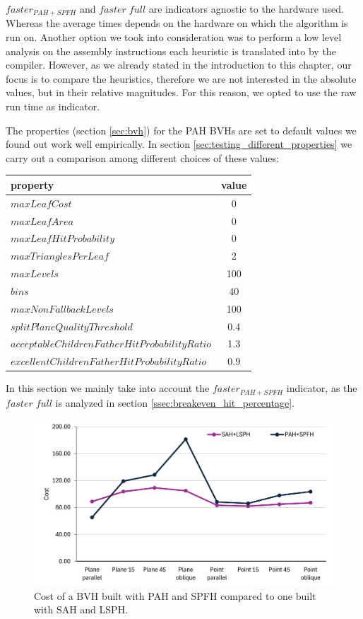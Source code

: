 \documentclass{PoliMi_MasterThesis}
\begin{document}
$faster_{PAH+SPFH}$ and $faster \; full$ are indicators agnostic to the hardware used. Whereas the average times depends on the hardware on which the algorithm is run on. Another option we took into consideration was to perform a low level analysis on the assembly instructions each heuristic is translated into by the compiler. However, as we already stated in the introduction to this chapter, our focus is to compare the heuristics, therefore we are not interested in the absolute values, but in their relative magnitudes. For this reason, we opted to use the raw run time as indicator.

The properties (section \ref{sec:bvh}) for the PAH BVHs are set to default values we found out work well empirically. In section \ref{sec:testing_different_properties} we carry out a comparison among different choices of these values:

\begin{table}[H]
	\centering
	\begin{tabular}{| l | c |}
		\hline
		\textbf{property} & \textbf{value}\\
		\hline
		\hline
		$maxLeafCost$ & 0\\
		$maxLeafArea$ & 0\\
		$maxLeafHitProbability$ & 0\\
		$maxTrianglesPerLeaf$ & 2\\
		$maxLevels$ & 100\\
		$bins$ & 40\\
		$maxNonFallbackLevels$ & 100\\
		$splitPlaneQualityThreshold$ & 0.4\\
		$acceptableChildrenFatherHitProbabilityRatio$ & 1.3\\
		$excellentChildrenFatherHitProbabilityRatio$ & 0.9\\
		\hline
	\end{tabular}
	\label{tab:standard_properties}
\end{table}

In this section we mainly take into account the $faster_{PAH+SPFH}$ indicator, as the $faster \; full$ is analyzed in section \ref{ssec:breakeven_hit_percentage}.

\begin{figure}[H] 
	\centering
	\includegraphics[width=\textwidth]{Images/pah_without_fallback_faster_chart.png}
	\caption{Cost of a BVH built with PAH and SPFH compared to one built with SAH and LSPH.}
	\label{fig:pah_without_fallback_faster_chart}
\end{figure}
\end{document}
